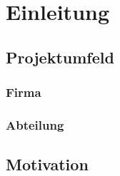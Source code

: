 
\chapter{Einleitung}


\section{Projektumfeld}


\subsection{Firma}


\subsection{Abteilung}


\section{Motivation}



